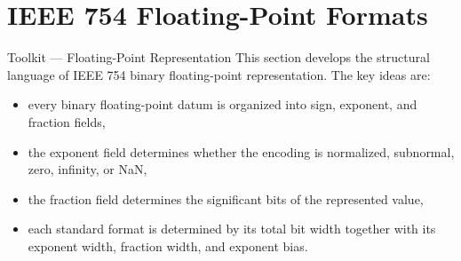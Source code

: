 \section{IEEE 754 Floating-Point Formats}

\begin{toolkitbox}{Toolkit --- Floating-Point Representation}
This section develops the structural language of IEEE 754 binary floating-point
representation. The key ideas are:

\begin{itemize}
    \item every binary floating-point datum is organized into sign, exponent, and fraction fields,
    \item the exponent field determines whether the encoding is normalized, subnormal, zero, infinity, or NaN,
    \item the fraction field determines the significant bits of the represented value,
    \item each standard format is determined by its total bit width together with its exponent width, fraction width, and exponent bias.
\end{itemize}
\end{toolkitbox}


